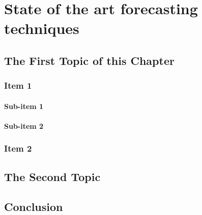 \chapter{State of the art forecasting techniques}
\label{cha:n}
\lipsum[79]

\section{The First Topic of this Chapter}
\subsection{Item 1}
\subsubsection{Sub-item 1}
\lipsum[80]

\subsubsection{Sub-item 2}
\lipsum[81]

\subsection{Item 2}
\lipsum[82]

\section{The Second Topic}
\lipsum[83-85]

\section{Conclusion}
\lipsum[86-88]

